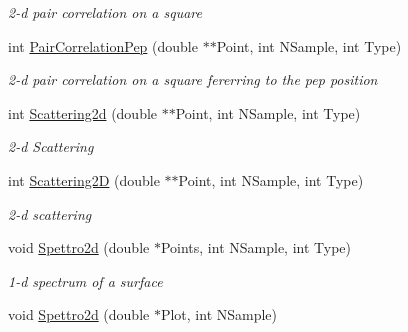 \begin{DoxyCompactItemize}
\begin{DoxyCompactList}\small\item\em 2-\/d pair correlation on a square \end{DoxyCompactList}\item 
\hypertarget{classVarData_a4b5e0c5a85245095780f116b7432df5b}{int \hyperlink{classVarData_a4b5e0c5a85245095780f116b7432df5b}{\-Pair\-Correlation\-Pep} (double $\ast$$\ast$\-Point, int \-N\-Sample, int \-Type)}\label{classVarData_a4b5e0c5a85245095780f116b7432df5b}

\begin{DoxyCompactList}\small\item\em 2-\/d pair correlation on a square fererring to the pep position \end{DoxyCompactList}\item 
\hypertarget{classVarData_a6499011573215b41c430029fddef1c97}{int \hyperlink{classVarData_a6499011573215b41c430029fddef1c97}{\-Scattering2d} (double $\ast$$\ast$\-Point, int \-N\-Sample, int \-Type)}\label{classVarData_a6499011573215b41c430029fddef1c97}

\begin{DoxyCompactList}\small\item\em 2-\/d \-Scattering \end{DoxyCompactList}\item 
\hypertarget{classVarData_a65f00067c992aa2edca4a59b750d1d10}{int \hyperlink{classVarData_a65f00067c992aa2edca4a59b750d1d10}{\-Scattering2\-D} (double $\ast$$\ast$\-Point, int \-N\-Sample, int \-Type)}\label{classVarData_a65f00067c992aa2edca4a59b750d1d10}

\begin{DoxyCompactList}\small\item\em 2-\/d scattering \end{DoxyCompactList}\item 
\hypertarget{classVarData_a2ad0f2350b0470eae15cfad3e6ce2343}{void \hyperlink{classVarData_a2ad0f2350b0470eae15cfad3e6ce2343}{\-Spettro2d} (double $\ast$\-Points, int \-N\-Sample, int \-Type)}\label{classVarData_a2ad0f2350b0470eae15cfad3e6ce2343}

\begin{DoxyCompactList}\small\item\em 1-\/d spectrum of a surface \end{DoxyCompactList}\item 
\hypertarget{classVarData_aad697561fff7291ab172d5e053e5c5fc}{void \hyperlink{classVarData_aad697561fff7291ab172d5e053e5c5fc}{\-Spettro2d} (double $\ast$\-Plot, int \-N\-Sample)}\label{classVarData_aad697561fff7291ab172d5e053e5c5fc}


\end{DoxyCompactItemize}
